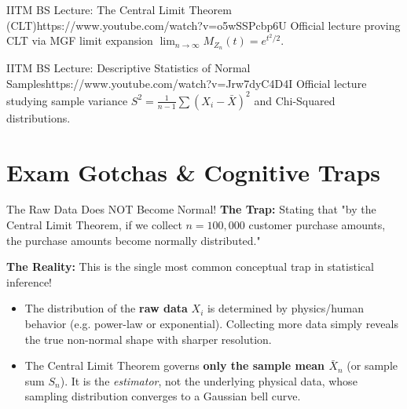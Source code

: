 \begin{videocard}{IITM BS Lecture: The Central Limit Theorem (CLT)}{https://www.youtube.com/watch?v=o5wSSPcbp6U}
Official lecture proving CLT via MGF limit expansion $\lim_{n\to\infty} M_{Z_n}(t) = e^{t^2/2}$.
\end{videocard}

\begin{videocard}{IITM BS Lecture: Descriptive Statistics of Normal Samples}{https://www.youtube.com/watch?v=Jrw7dyC4D4I}
Official lecture studying sample variance $S^2 = \frac{1}{n-1}\sum (X_i - \bar{X})^2$ and Chi-Squared distributions.
\end{videocard}

\section{Exam Gotchas \& Cognitive Traps}

\begin{trapbox}{The Raw Data Does NOT Become Normal!}
\textbf{The Trap:} Stating that "by the Central Limit Theorem, if we collect $n = 100,000$ customer purchase amounts, the purchase amounts become normally distributed."

\textbf{The Reality:} This is the single most common conceptual trap in statistical inference!
\begin{itemize}
    \item The distribution of the \textbf{raw data} $X_i$ is determined by physics/human behavior (e.g. power-law or exponential). Collecting more data simply reveals the true non-normal shape with sharper resolution.
    \item The Central Limit Theorem governs \textbf{only the sample mean $\bar{X}_n$} (or sample sum $S_n$). It is the \emph{estimator}, not the underlying physical data, whose sampling distribution converges to a Gaussian bell curve.
\end{itemize}
\end{trapbox}

